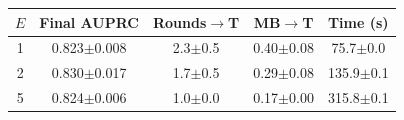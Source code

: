 \begin{tabular}{ccccc}
\toprule
$E$ & Final AUPRC & Rounds$\to$T & MB$\to$T & Time (s) \\
\midrule
1 & 0.823$\pm$0.008 & 2.3$\pm$0.5 & 0.40$\pm$0.08 & 75.7$\pm$0.0 \\
2 & 0.830$\pm$0.017 & 1.7$\pm$0.5 & 0.29$\pm$0.08 & 135.9$\pm$0.1 \\
5 & 0.824$\pm$0.006 & 1.0$\pm$0.0 & 0.17$\pm$0.00 & 315.8$\pm$0.1 \\
\bottomrule
\end{tabular}
